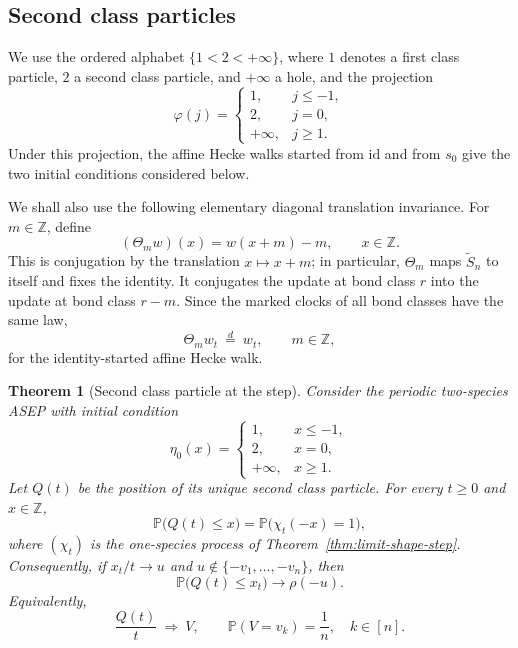 \documentclass[11pt,a4paper]{amsart}
\newtheorem{theorem}{Theorem}[section]
\theoremstyle{definition}
\theoremstyle{remark}
\numberwithin{equation}{section}
\newcommand{\Z}{\mathbb Z}
\newcommand{\Pp}{\mathbb P}
\newcommand{\wtS}{\widetilde S_n}
\newcommand{\id}{\mathrm{id}}
\begin{document}
	\subsection{Second class particles}\label{subsec:second-class-particles}
	
	We use the ordered alphabet $\{1<2<+\infty\}$, where $1$ denotes a first
	class particle, $2$ a second class particle, and $+\infty$ a hole, and the
	projection
	\[
	\varphi(j)=
	\begin{cases}
		1,&j\le-1,\\
		2,&j=0,\\
		+\infty,&j\ge1.
	\end{cases}
	\]
	Under this projection, the affine Hecke walks started from $\id$ and from
	$s_0$ give the two initial conditions considered below.
	
	We shall also use the following elementary diagonal translation invariance.
	For $m\in\Z$, define
	\[
	(\Theta_m w)(x)=w(x+m)-m,
	\qquad x\in\Z.
	\]
	This is conjugation by the translation $x\mapsto x+m$; in particular,
	$\Theta_m$ maps $\wtS$ to itself and fixes the identity.  It conjugates the
	update at bond class $r$ into the update at bond class $r-m$.  Since the
	marked clocks of all bond classes have the same law,
	\begin{equation}\label{eq:diagonal-shift-invariance}
		\Theta_m w_t\ \stackrel d=\ w_t,
		\qquad m\in\Z,
	\end{equation}
	for the identity-started affine Hecke walk.
	
	\begin{theorem}[Second class particle at the step]
		\label{thm:second-class-step}
		Consider the periodic two-species ASEP with initial condition
		\begin{equation}\label{eq:second-class-step-initial}
			\eta_0(x)=
			\begin{cases}
				1,&x\le-1,\\
				2,&x=0,\\
				+\infty,&x\ge1.
			\end{cases}
		\end{equation}
		Let $Q(t)$ be the position of its unique second class particle.  For every
		$t\ge0$ and $x\in\Z$,
		\begin{equation}\label{eq:second-class-exact-identity}
			\Pp\bigl(Q(t)\le x\bigr)
			=\Pp\bigl(\chi_t(-x)=1\bigr),
		\end{equation}
		where $(\chi_t)$ is the one-species process of
		Theorem~\ref{thm:limit-shape-step}.  Consequently, if $x_t/t\to u$ and
		$u\notin\{-v_1,\ldots,-v_n\}$, then
		\begin{equation}\label{eq:second-class-step-limit}
			\Pp\bigl(Q(t)\le x_t\bigr)\longrightarrow\rho(-u).
		\end{equation}
		Equivalently,
		\begin{equation}\label{eq:second-class-uniform-speed}
			\frac{Q(t)}t\ \Longrightarrow\ V,
			\qquad
			\Pp(V=v_k)=\frac1n,
			\quad k\in[n].
		\end{equation}
	\end{theorem}
	
\end{document}
